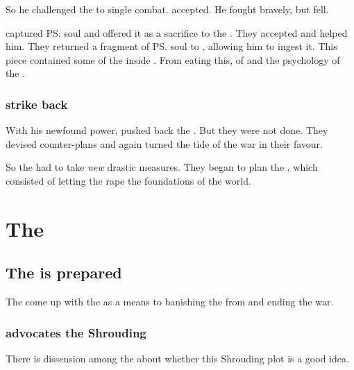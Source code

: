 So he challenged the \sathariah{}  to single combat. 
\Nathrach{} accepted. 
He fought bravely, but fell. 

\Ishnaruchaefir{} captured \ps{\Nathrach} soul and offered it as a sacrifice to the \xss. 
They accepted and helped him. 
They returned a fragment of \ps{\Nathrach} soul to \Ishnaruchaefir, allowing him to ingest it. 
This piece contained some of the  inside \Nathrach. 
From eating this, \Ishnaruchaefir{}  of  and the psychology of the \satharioth. 





\subsubsection{\Resphain{} strike back}
With his newfound power, \Ishnaruchaefir{} pushed back the \resphain.
But they were not done. 
They devised counter-plans and again turned the tide of the war in their favour. 

So the \dragons{} had to take \emph{new} drastic measures. 
They began to plan the , which consisted of letting the \xss{} rape the foundations of the world. 














\section{The \SecondShrouding}
\subsection{The \SecondShrouding{} is prepared}
The \dragons{} come up with the \SecondShrouding{} as a means to banishing the \banelords{} from \Miith{} and ending the war.





\subsubsection{\Ishnaruchaefir{} advocates the Shrouding}
There is dissension among the \dragons{} about whether this Shrouding plot is a good idea. 

